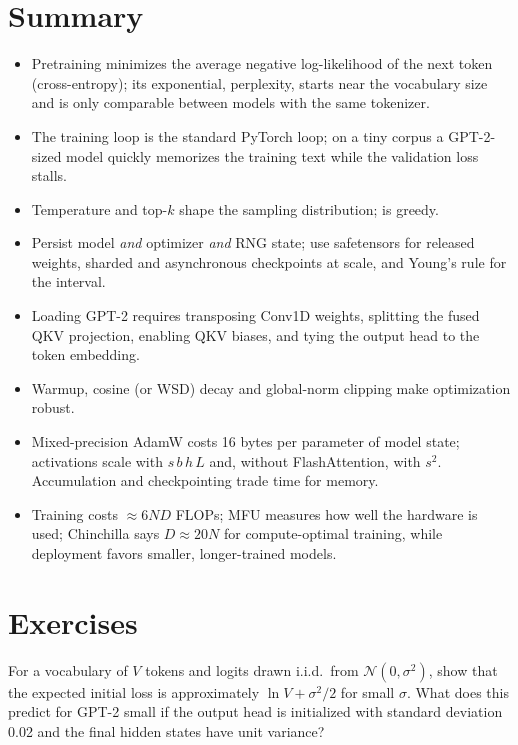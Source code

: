 \section{Summary}\label{sec:pretrain:summary}
\begin{itemize}
\item Pretraining minimizes the average negative log-likelihood of the next token
  (cross-entropy); its exponential, perplexity, starts near the vocabulary size and is only
  comparable between models with the same tokenizer.
\item The training loop is the standard PyTorch loop; on a tiny corpus a GPT-2-sized model
  quickly memorizes the training text while the validation loss stalls.
\item Temperature and top-$k$ shape the sampling distribution;  is greedy.
\item Persist model \emph{and} optimizer \emph{and} RNG state; use safetensors for released
  weights, sharded and asynchronous checkpoints at scale, and Young's rule for the interval.
\item Loading GPT-2 requires transposing Conv1D weights, splitting the fused QKV projection,
  enabling QKV biases, and tying the output head to the token embedding.
\item Warmup, cosine (or WSD) decay and global-norm clipping make optimization robust.
\item Mixed-precision AdamW costs 16 bytes per parameter of model state; activations scale with
  $s\,b\,h\,L$ and, without FlashAttention, with $s^2$. Accumulation and checkpointing trade
  time for memory.
\item Training costs $\approx6ND$ FLOPs; MFU measures how well the hardware is used; Chinchilla
  says $D\approx20N$ for compute-optimal training, while deployment favors smaller, longer-trained
  models.
\end{itemize}

\section{Exercises}\label{sec:pretrain:exercises}

\begin{exercise}
For a vocabulary of $V$ tokens and logits drawn i.i.d.\ from $\mathcal N(0,\sigma^2)$, show
that the expected initial loss is approximately $\ln V + \sigma^2/2$ for small $\sigma$. What
does this predict for GPT-2 small if the output head is initialized with standard deviation
0.02 and the final hidden states have unit variance?
\end{exercise}

